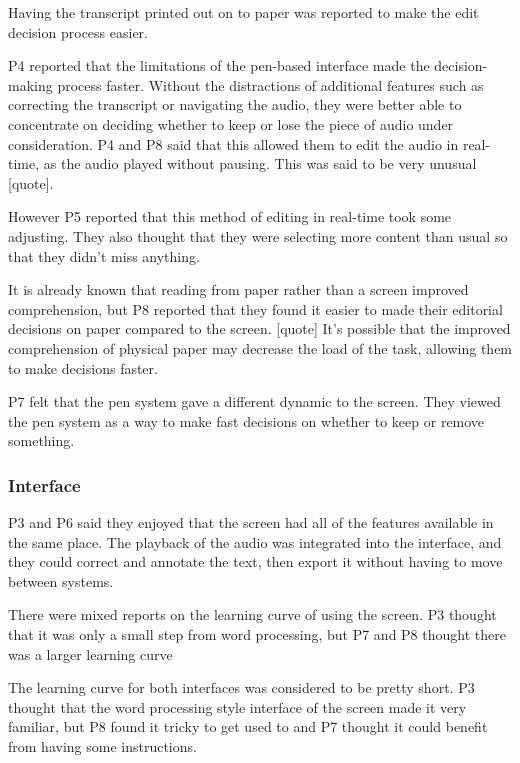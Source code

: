 
Having the transcript printed out on to paper was reported to make the edit decision process easier.

P4 reported that the limitations of the pen-based interface made the decision-making process faster. Without the
distractions of additional features such as correcting the transcript or navigating the audio, they were better able to
concentrate on deciding whether to keep or lose the piece of audio under consideration. P4 and P8 said that this
allowed them to edit the audio in real-time, as the audio played without pausing. This was said to be very unusual
[quote].

However P5 reported that this method of editing in real-time took some adjusting. They also thought that they were
selecting more content than usual so that they didn't miss anything.


It is already known that reading from paper rather than a screen improved comprehension, but P8 reported that they
found it easier to made their editorial decisions on paper compared to the screen. [quote] It's possible that the
improved comprehension of physical paper may decrease the load of the task, allowing them to make decisions faster.

P7 felt that the pen system gave a different dynamic to the screen. They viewed the pen system as a way to make fast
decisions on whether to keep or remove something.

\subsubsection{Interface}


P3 and P6 said they enjoyed that the screen had all of the features available in the same place. The playback of the
audio was integrated into the interface, and they could correct and annotate the text, then export it without having to
move between systems.


There were mixed reports on the learning curve of using the screen. P3 thought that it was only a small step from word
processing, but P7 and P8 thought there was a larger learning curve

The learning curve for both interfaces was considered to be pretty short. P3 thought that the word processing style
interface of the screen made it very familiar, but P8 found it tricky to get used to and P7 thought it could benefit
from having some instructions.

